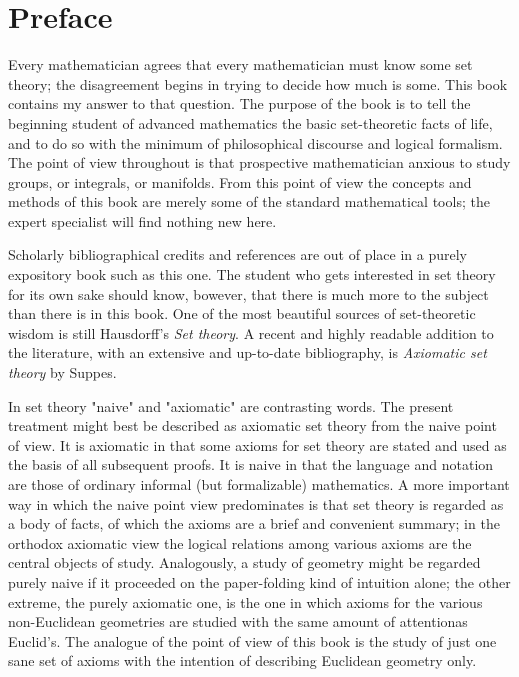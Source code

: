 
\chapter*{Preface}

	Every mathematician agrees that every mathematician must know some set theory; the disagreement begins in trying to decide how much is some. This book contains my answer to that question. The purpose of the book is to tell the beginning student of advanced mathematics the basic set-theoretic facts of life, and to do so with the minimum of philosophical discourse and logical  formalism. The point of view throughout is that prospective mathematician anxious to study groups, or integrals, or manifolds. From this point of view the concepts and methods of this book are merely some of the standard mathematical tools; the expert specialist will find nothing new here.
    
	Scholarly bibliographical credits and references are out of place in a purely expository book such as this one. The student who gets interested in set theory for its own sake should know, bowever, that there is much more to the subject than there is in this book. One of the most beautiful sources of set-theoretic wisdom is still Hausdorff's \textit{Set theory}. A recent and highly readable addition to the literature, with an extensive and up-to-date bibliography, is \textit{Axiomatic set theory} by Suppes. 
    

	In set theory "naive" and "axiomatic" are contrasting words. The present treatment might best be described as axiomatic set theory from the naive point of view. It is axiomatic in that some axioms for set theory are stated and used as the basis of all subsequent proofs. It is naive in that the language and notation are those of ordinary informal (but formalizable) mathematics. A more important way in which the naive point view predominates is that set theory is regarded as a body of facts, of which the axioms are a brief and convenient summary; in the orthodox axiomatic view the logical relations among various axioms are the central objects of study. Analogously, a study of geometry might be regarded purely naive if it proceeded on the paper-folding kind of intuition alone; the other extreme, the purely axiomatic one, is the one in which axioms for the various non-Euclidean geometries are studied with the same amount of attentionas Euclid's. The analogue of the point of view of this book is the study of just one sane set of axioms with the intention of describing Euclidean geometry only.
    

